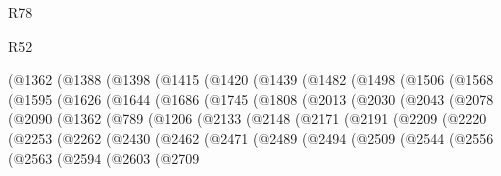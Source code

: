 \begin{lexlean}{R78}
\begin{lexlean}{R52}
\begin{coremodule}
{{{{{{{{{{{{{{{{{{{{{{{{{{{{{{{{{{{{{{{{{{{{{{{{{{{{{{{{{{{{{{{{{{{{{{{{{{{{{{{{{{{{{{{{{{{{{{{{{{{{{{{{{{{{{{{{{{{{{{{{{{{{{{{{{{{{{{{{{{{{{{{{{{{{{{{{{{{{{{{{{{{{{{{{{{{{{{{{{{{{{{{{{{{{{{{{{{{{{{          (@1362
            (@1388
              (@1398
                (@1415
                  (@1420
                    (@1439
                      (@1482
                        (@1498
                          (@1506
                            (@1568
                              (@1595
                                (@1626
                                  (@1644
                                    (@1686
                                      (@1745
                                        (@1808
                                          (@2013
                                            (@2030
                                              (@2043
                                                (@2078
                                                  (@2090
                                                    (@1362
                                                      (@789
                                                        (@1206
                                                          (@2133
                                                            (@2148
                                                              (@2171
                                                                (@2191
                                                                  (@2209
                                                                    (@2220
                                                                      (@2253
                                                                        (@2262
                                                                          (@2430
                                                                            (@2462
                                                                              (@2471
                                                                                (@2489
                                                                                  (@2494
                                                                                    (@2509
                                                                                      (@2544
                                                                                        (@2556
                                                                                          (@2563
                                                                                            (@2594
                                                                                              (@2603
                                                                                                (@2709
}}}}}}}}}}}}}}}}}}}}}}}}}}}}}}}}}}}}}}}}}}}}}}}}}}}}}}}}}}}}}}}}}}}}}}}}}}}}}}}}}}}}}}}}}}}}}}}}}}}}}}}}}}}}}}}}}}}}}}}}}}}}}}}}}}}}}}}}}}}}}}}}}}}}}}}}}}}}}}}}}}}}}}}}}}}}}}}}}}}}}}}}}}}}}}}}}}}}}}
\end{coremodule}
\end{lexlean}
\end{lexlean}
